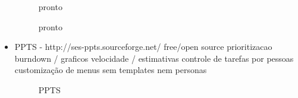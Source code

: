 \begin{itemize}
\begin{figure}[H]
  \centering
  \caption{pronto}
\end{figure}

\begin{figure}[H]
  \centering
  \caption{pronto}
\end{figure}

\item PPTS - http://ses-ppts.sourceforge.net/
free/open source
prioritizacao
burndown / graficos
velocidade / estimativas
controle de tarefas por pessoas
customização de menus
sem templates nem personas

\begin{figure}[H]
  \centering
  \caption{PPTS}
\end{figure}


\end{itemize}
